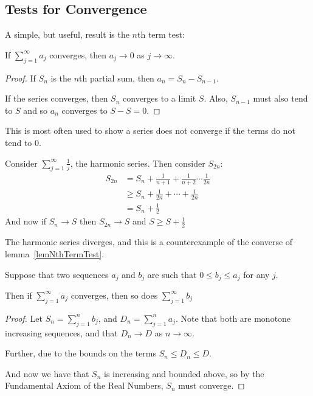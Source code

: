 \documentclass[../Main.tex]{subfiles}
\begin{document}
\subsection{Tests for Convergence}
A simple, but useful, result is the $n$th term test:
\begin{lemma}
    If $\sum_{j=1}^\infty a_j$ converges, then $a_j \to 0$ as $j \to \infty$.
    \label{lemNthTermTest}
\end{lemma}
\begin{proof}
    If $S_n$ is the $n$th partial sum, then $a_n = S_n - S_{n-1}$.\par
    If the series converges, then $S_n$ converges to a limit $S$. Also, $S_{n-1}$ must also tend to $S$ and so $a_n$ converges to $S - S = 0$.
\end{proof}
\begin{remark}
    This is most often used to show a series does not converge if the terms do not tend to 0.
\end{remark}
\begin{example}
    Consider $\sum_{j=1}^\infty \frac{1}{j}$, the harmonic series.
    Then consider $S_{2n}$:
    \begin{align*}
        S_{2n} &= S_n + \frac{1}{n+1} + \frac{1}{n+2} \cdots \frac{1}{2n} \\
        &\geq S_n + \frac{1}{2n} + \cdots + \frac{1}{2n} \\
        &= S_n + \frac{1}{2}
    \end{align*}
    And now if $S_n \to S$ then $S_{2n} \to S$ and $S \geq S + \frac{1}{2}$ \contradiction\par
    The harmonic series diverges, and this is a counterexample of the converse of lemma~\ref{lemNthTermTest}.
\end{example}
\begin{theorem}
    Suppose that two sequences $a_j$ and $b_j$ are such that $0 \leq b_j \leq a_j$ for any $j$.\par
    Then if $\sum_{j=1}^\infty a_j$ converges, then so does $\sum_{j=1}^\infty b_j$
    \label{thmComparisonTest}
\end{theorem}
\begin{proof}
    Let $S_n = \sum_{j=1}^n b_j$, and $D_n = \sum_{j=1}^n a_j$. Note that both are monotone increasing sequences, and that $D_n \to D$ as $n \to \infty$.\par
    Further, due to the bounds on the terms $S_n \leq D_n \leq D$.\par
    And now we have that $S_n$ is increasing and bounded above, so by the Fundamental Axiom of the Real Numbers, $S_n$ must converge.
\end{proof}
\end{document}
